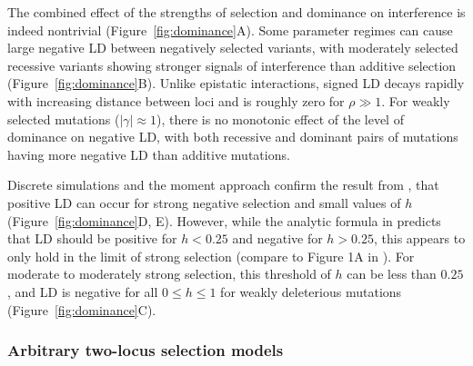 \documentclass[]{article}
\begin{document}
The combined effect of the strengths of selection and dominance on interference
is indeed nontrivial (Figure~\ref{fig:dominance}A). Some parameter regimes can
cause large negative LD between negatively selected variants, with
moderately selected recessive variants showing stronger signals of interference
than additive selection (Figure~\ref{fig:dominance}B). Unlike epistatic
interactions, signed LD decays rapidly with increasing distance between loci
and is roughly zero for \(\rho \gg 1\). For weakly selected mutations
(\(|\gamma|\approx 1\)), there is no monotonic effect of the level of dominance
on negative LD, with both recessive and dominant pairs of mutations having more
negative LD than additive mutations.

Discrete simulations and the moment approach confirm the result from
\citet{Roze2021-cf}, that positive LD can occur for strong negative selection
and small values of \(h\) (Figure~\ref{fig:dominance}D, E). However, while the
analytic formula in \citet{Roze2021-cf} predicts that LD should be positive for
\(h<0.25\) and negative for \(h>0.25\), this appears to only hold in the limit
of strong selection (compare to Figure 1A in \citet{Roze2021-cf}). For moderate
to moderately strong selection, this threshold of \(h\) can be less than
\(0.25\), and LD is negative for all \(0\leq h \leq 1\) for weakly deleterious
mutations (Figure~\ref{fig:dominance}C).

\subsubsection{Arbitrary two-locus selection models}
\label{sec:general-selection}
\end{document}
